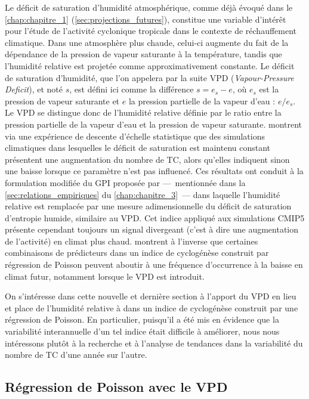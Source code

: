 \documentclass[../main.tex]{subfiles}
\begin{document}
Le déficit de saturation d'humidité atmosphérique, comme déjà évoqué dans le \cref{chap:chapitre_1} (\cref{sec:projections_futures}), constitue une variable
d'intérêt pour l'étude de l'activité cyclonique tropicale dans le contexte de réchauffement climatique. Dans une atmosphère plus chaude, celui-ci augmente du
fait de la dépendance de la pression de vapeur saturante à la température, tandis que l'humidité relative est projetée comme approximativement constante. Le
déficit de saturation d'humidité, que l'on appelera par la suite VPD (\textit{Vapour-Pressure Deficit}), et noté $s$, est défini ici comme la différence $s =
e_s - e$, où $e_s$ est la pression de vapeur saturante et $e$ la pression partielle de la vapeur d'eau : $e / e_s$. Le VPD se distingue donc de l'humidité
relative définie par le ratio entre la pression partielle de la vapeur d'eau et la pression de vapeur saturante. \textcite{emanuel_hurricanes_2008} montrent via
une expérience de descente d'échelle statistique que des simulations climatiques dans lesquelles le déficit de saturation est maintenu constant présentent une
augmentation du nombre de TC, alors qu'elles indiquent sinon une baisse lorsque ce paramètre n'est pas influencé. Ces résultats ont conduit à la formulation
modifiée du GPI proposée par \textcite{emanuel_tropical_2010} ---~mentionnée dans la \cref{sec:relations_empiriques} du \cref{chap:chapitre_3}~--- dans laquelle
l'humidité relative est remplacée par une mesure adimensionnelle du déficit de saturation d'entropie humide, similaire au VPD. Cet indice appliqué aux
simulations CMIP5 présente cependant toujours un signal divergeant (c'est à dire une augmentation de l'activité) en climat plus chaud.
\textcite{camargo_testing_2014} montrent à l'inverse que certaines combinaisons de prédicteurs dans un indice de cyclogénèse construit par régression de Poisson
peuvent aboutir à une fréquence d'occurrence à la baisse en climat futur, notamment lorsque le VPD est introduit.

On s'intéresse dans cette nouvelle et dernière section à l'apport du VPD en lieu et place de l'humidité relative à  dans un indice de cyclogénèse
construit par une régression de Poisson. En particulier, puisqu'il a été mis en évidence que la variabilité interannuelle d'un tel indice était difficile à
améliorer, nous nous intéressons plutôt à la recherche et à l'analyse de tendances dans la variabilité du nombre de TC d'une année sur l'autre.

\subsection{Régression de Poisson avec le VPD}
\end{document}
